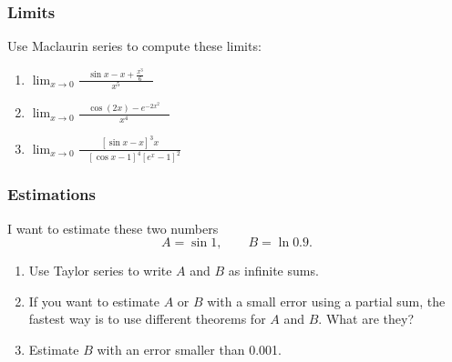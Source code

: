 \documentclass[14pt]{beamer}
\begin{document}
\begin{frame}[t]
	\frametitle{Limits}

	Use Maclaurin series to compute these limits:
	\vfill

	\begin{enumerate}
		\item \; $\displaystyle \lim_{x \to 0}\frac{\quad \sin x - x +
			\frac{x^{3}}{6} \quad }{x^{5}}$
			\vfill

		\item \; $\displaystyle \lim_{x \to 0}\frac{\quad \cos(2x) - e^{-2x^2}\quad }{x^{4}}$
			\vfill

		\item \; $\displaystyle \lim_{x \to 0}\frac{\left[ \sin x - x \right]^{3}x }{\quad
			\left[ \cos x - 1\right]^{4}\left[ e^{x}- 1 \right]^{2}}\quad$
			\vfill
	\end{enumerate}
\end{frame}

\begin{frame}[t]
	\frametitle{Estimations}

	I want to estimate these two numbers
	\[
		A = \sin 1, \quad \quad B = \ln 0.9.
	\]

	\begin{enumerate}
		\item Use Taylor series to write $A$ and $B$ as infinite sums.
			\vspace{.5cm}

		\item If you want to estimate $A$ or $B$ with a small error using a partial sum,
			the fastest way is to use different theorems for $A$ and $B$. What are they?
			\vspace{.5cm}

		\item Estimate $B$ with an error smaller than 0.001.
	\end{enumerate}
\end{frame}
\end{document}
